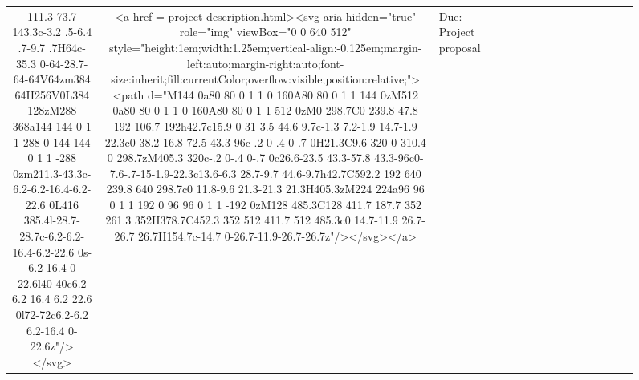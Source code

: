 \documentclass[
]{article}
\begin{document}
\begin{figure*}
\begin{longtable*}{cclllccccccccccl}
111.3 73.7 143.3c-3.2 .5-6.4 .7-9.7 .7H64c-35.3 0-64-28.7-64-64V64zm384 64H256V0L384 128zM288 368a144 144 0 1 1 288 0 144 144 0 1 1 -288 0zm211.3-43.3c-6.2-6.2-16.4-6.2-22.6 0L416 385.4l-28.7-28.7c-6.2-6.2-16.4-6.2-22.6 0s-6.2 16.4 0 22.6l40 40c6.2 6.2 16.4 6.2 22.6 0l72-72c6.2-6.2 6.2-16.4 0-22.6z"/></svg> & <a href = project-description.html><svg aria-hidden="true" role="img" viewBox="0 0 640 512" style="height:1em;width:1.25em;vertical-align:-0.125em;margin-left:auto;margin-right:auto;font-size:inherit;fill:currentColor;overflow:visible;position:relative;"><path d="M144 0a80 80 0 1 1 0 160A80 80 0 1 1 144 0zM512 0a80 80 0 1 1 0 160A80 80 0 1 1 512 0zM0 298.7C0 239.8 47.8 192 106.7 192h42.7c15.9 0 31 3.5 44.6 9.7c-1.3 7.2-1.9 14.7-1.9 22.3c0 38.2 16.8 72.5 43.3 96c-.2 0-.4 0-.7 0H21.3C9.6 320 0 310.4 0 298.7zM405.3 320c-.2 0-.4 0-.7 0c26.6-23.5 43.3-57.8 43.3-96c0-7.6-.7-15-1.9-22.3c13.6-6.3 28.7-9.7 44.6-9.7h42.7C592.2 192 640 239.8 640 298.7c0 11.8-9.6 21.3-21.3 21.3H405.3zM224 224a96 96 0 1 1 192 0 96 96 0 1 1 -192 0zM128 485.3C128 411.7 187.7 352 261.3 352H378.7C452.3 352 512 411.7 512 485.3c0 14.7-11.9 26.7-26.7 26.7H154.7c-14.7 0-26.7-11.9-26.7-26.7z"/></svg></a> & Due: Project proposal \\ 

\end{longtable*}
\end{figure*}
\end{document}
